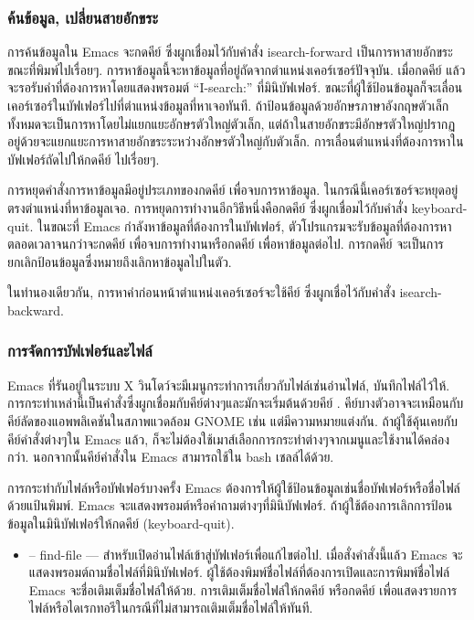 \begin{thwbr}
\subsubsection{ค้นข้อมูล, เปลี่ยนสายอักขระ}
การค้นข้อมูลใน Emacs จะกดคีย์  ซึ่งผูกเชื่อมไว้กับคำสั่ง isearch-forward เป็นการหาสายอักขระขณะที่พิมพ์ไปเรื่อยๆ. การหาข้อมูลนี้จะหาข้อมูลที่อยู่ถัดจากตำแหน่งเคอร์เซอร์ปัจจุบัน. เมื่อกดคีย์  แล้วจะรอรับคำที่ต้องการหาโดยแสดงพรอมต์ ``I-search:'' ที่มินิบัฟเฟอร์. ขณะที่ผู้ใช้ป้อนข้อมูลก็จะเลื่อนเคอร์เซอร์ในบัฟเฟอร์ไปที่ตำแหน่งข้อมูลที่หาเจอทันที. ถ้าป้อนข้อมูลด้วยอักษรภาษาอังกฤษตัวเล็กทั้งหมดจะเป็นการหาโดยไม่แยกแยะอักษรตัวใหญ่ตัวเล็ก, แต่ถ้าในสายอักขระมีอักษรตัวใหญ่ปรากฏอยู่ด้วยจะแยกแยะการหาสายอักขระระหว่างอักษรตัวใหญ่กับตัวเล็ก. การเลื่อนตำแหน่งที่ต้องการหาในบัฟเฟอร์ถัดไปให้กดคีย์  ไปเรื่อยๆ. 

การหยุดคำสั่งการหาข้อมูลมีอยู่ประเภทของกดคีย์  เพื่อจบการหาข้อมูล. ในกรณีนี้เคอร์เซอร์จะหยุดอยู่ตรงตำแหน่งที่หาข้อมูลเจอ. การหยุดการทำงานอีกวิธีหนึ่งคือกดคีย์  ซึ่งผูกเชื่อมไว้กับคำสั่ง keyboard-quit. ในขณะที่ Emacs กำลังหาข้อมูลที่ต้องการในบัฟเฟอร์, ตัวโปรแกรมจะรับข้อมูลที่ต้องการหาตลอดเวลาจนกว่าจะกดคีย์  เพื่อจบการทำงานหรือกดคีย์  เพื่อหาข้อมูลต่อไป. การกดคีย์  จะเป็นการยกเลิกป้อนข้อมูลซึ่งหมายถึงเลิกหาข้อมูลไปในตัว. 

ในทำนองเดียวกัน, การหาคำก่อนหน้าตำแหน่งเคอร์เซอร์จะใช้คีย์  ซึ่งผูกเชื่อไว้กับคำสั่ง isearch-backward. 

\subsubsection{การจัดการบัฟเฟอร์และไฟล์}
Emacs ที่รันอยู่ในระบบ X วินโดว์จะมีเมนูกระทำการเกี่ยวกับไฟล์เช่นอ่านไฟล์, บันทึกไฟล์ไว้ให้. การกระทำเหล่านี้เป็นคำสั่งซึ่งผูกเชื่อมกับคีย์ต่างๆและมักจะเริ่มต้นด้วยคีย์ . คีย์บางตัวอาจจะเหมือนกับคีย์ลัดของแอพพลิเคชันในสภาพแวดล้อม GNOME เช่น  แต่มีความหมายแต่งกัน. ถ้าผู้ใช้คุ้นเคยกับคีย์คำสั่งต่างๆใน Emacs แล้ว, ก็จะไม่ต้องใช้เมาส์เลือกการกระทำต่างๆจากเมนูและใช้งานได้คล่องกว่า. นอกจากนั้นคีย์คำสั่งใน Emacs สามารถใช้ใน bash เชลล์ได้ด้วย.

การกระทำกับไฟล์หรือบัฟเฟอร์บางครั้ง Emacs ต้องการให้ผู้ใช้ป้อนข้อมูลเช่นชื่อบัฟเฟอร์หรือชื่อไฟล์ด้วยแป้นพิมพ์. Emacs จะแสดงพรอมต์หรือคำถามต่างๆที่มินิบัฟเฟอร์. ถ้าผู้ใช้ต้องการเลิกการป้อนข้อมูลในมินิบัฟเฟอร์ให้กดคีย์  (keyboard-quit).

\begin{itemize}
\item {} -- find-file --- สำหรับเปิดอ่านไฟล์เข้าสู่บัฟเฟอร์เพื่อแก้ไขต่อไป. เมื่อสั่งคำสั่งนี้แล้ว Emacs จะแสดงพรอมต์ถามชื่อไฟล์ที่มินิบัฟเฟอร์. ผู้ใช้ต้องพิมพ์ชื่อไฟล์ที่ต้องการเปิดและการพิมพ์ชื่อไฟล์ Emacs จะชื่อเติมเต็มชื่อไฟล์ให้ด้วย. การเติมเต็มชื่อไฟล์ให้กดคีย์  หรือกดคีย์  เพื่อแสดงรายการไฟล์หรือไดเรกทอรีในกรณีที่ไม่สามารถเติมเต็มชื่อไฟล์ให้ทันที. 




\end{itemize}
\end{thwbr}
